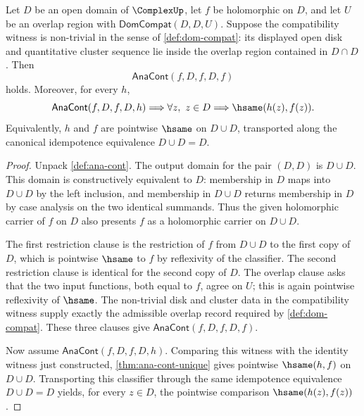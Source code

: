 \begin{theorem}
\label{thm:ana-cont-identity-law}
Let $D$ be an open domain of $\ComplexUp$, let $f$ be holomorphic on $D$, and let $U$ be an overlap region with $\mathsf{DomCompat}(D,D,U)$. Suppose the compatibility witness is non-trivial in the sense of \autoref{def:dom-compat}: its displayed open disk and quantitative cluster sequence lie inside the overlap region contained in $D\cap D$. Then
$$
\mathsf{AnaCont}(f,D,f,D,f)
$$
holds. Moreover, for every $h$,
$$
\mathsf{AnaCont}(f,D,f,D,h)\Longrightarrow
\forall z,\ z\in D\Longrightarrow \hsame(h(z),f(z)).
$$
Equivalently, $h$ and $f$ are pointwise $\hsame$ on $D\cup D$, transported along the canonical idempotence equivalence $D\cup D=D$.
\end{theorem}
\begin{proof}
Unpack \autoref{def:ana-cont}. The output domain for the pair $(D,D)$ is $D\cup D$. This domain is constructively equivalent to $D$: membership in $D$ maps into $D\cup D$ by the left inclusion, and membership in $D\cup D$ returns membership in $D$ by case analysis on the two identical summands. Thus the given holomorphic carrier of $f$ on $D$ also presents $f$ as a holomorphic carrier on $D\cup D$.

The first restriction clause is the restriction of $f$ from $D\cup D$ to the first copy of $D$, which is pointwise $\hsame$ to $f$ by reflexivity of the classifier. The second restriction clause is identical for the second copy of $D$. The overlap clause asks that the two input functions, both equal to $f$, agree on $U$; this is again pointwise reflexivity of $\hsame$. The non-trivial disk and cluster data in the compatibility witness supply exactly the admissible overlap record required by \autoref{def:dom-compat}. These three clauses give $\mathsf{AnaCont}(f,D,f,D,f)$.

Now assume $\mathsf{AnaCont}(f,D,f,D,h)$. Comparing this witness with the identity witness just constructed, \autoref{thm:ana-cont-unique} gives pointwise $\hsame(h,f)$ on $D\cup D$. Transporting this classifier through the same idempotence equivalence $D\cup D=D$ yields, for every $z\in D$, the pointwise comparison $\hsame(h(z),f(z))$.
\end{proof}
